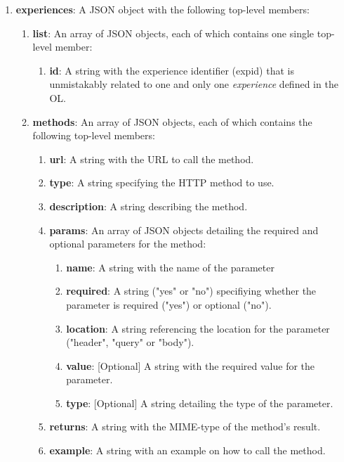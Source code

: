 \begin{enumerate}
    \item \textbf{experiences}: A JSON object with the following top-level members:
    \begin{enumerate}
        \item \textbf{list}: An array of JSON objects, each of which contains one single top-level member:
        \begin{enumerate}
            \item \textbf{id}: A string with the experience identifier (expid) that is unmistakably related to one and only one \textit{experience} defined in the OL.
        \end{enumerate}
        \item \textbf{methods}: An array of JSON objects, each of which contains the following top-level members:
        \begin{enumerate}
            \item \textbf{url}: A string with the URL to call the method.
            \item \textbf{type}: A string specifying the HTTP method to use.
            \item \textbf{description}: A string describing the method.
            \item \textbf{params}: An array of JSON objects detailing the required and optional parameters for the method:
            \begin{enumerate}
                \item \textbf{name}: A string with the name of the parameter
                \item \textbf{required}: A string ("yes" or "no") specifiying whether the parameter is required ("yes") or optional ("no").
                \item \textbf{location}: A string referencing the location for the parameter ("header", "query" or "body").
                \item \textbf{value}: [Optional] A string with the required value for the parameter.
                \item \textbf{type}: [Optional] A string detailing the type of the parameter.
            \end{enumerate}
            \item \textbf{returns}: A string with the MIME-type of the method's result.
            \item \textbf{example}: A string with an example on how to call the method.
        \end{enumerate}
    \end{enumerate}
\end{enumerate}

